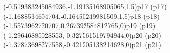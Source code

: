 \psPoint(-0.519383245084936,-1.19135168905065,1.5){p17}
\psdot[dotstyle=Bo,fillcolor=white](p17)
\psPoint(-1.1688534694704,-0.16450249981509,1.5){p18}
\psdot[dotstyle=Bo,fillcolor=white](p18)
\psPoint(-1.5573962720707,0.267392584812765,0){p19}
\psdot[dotstyle=Btriangle,fillcolor=white](p19)
\psPoint(-1.29646885028553,-0.327561519794944,0){p20}
\psdot[dotstyle=Btriangle,fillcolor=white](p20)
\psPoint(-1.37873698277558,-0.421205138214628,0){p21}
\psdot[dotstyle=Btriangle,fillcolor=white](p21)
